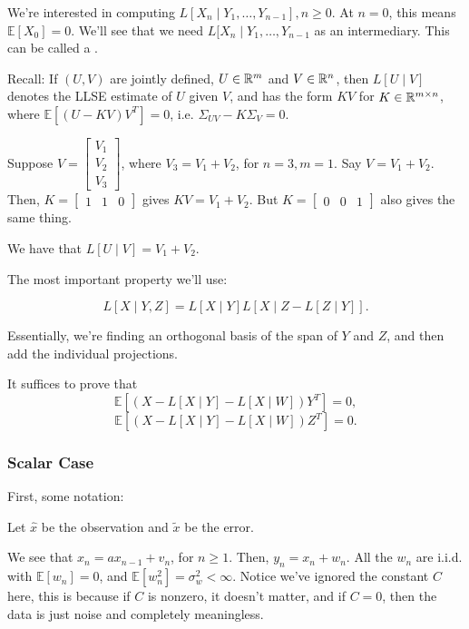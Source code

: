 \documentclass{article}
\newcommand{\EE}{\mathbb{E}}
\begin{document}
We're interested in computing $L[X_n \mid Y_1, \ldots, Y_{n-1}], n \geq 0$. At $n = 0$, this means $\EE[X_0] = 0$.
We'll see that we need $L[X_n \mid Y_1, \ldots, Y_{n-1}$ as an intermediary. This can be called a .

Recall: If $(U, V)$ are jointly defined, $U \in \mathbb R^m$ and $V \in \mathbb R^n$, then $L[U \mid V]$ denotes the LLSE estimate of $U$ given $V$, and has the form $KV$ for $K \in \mathbb R^{m \times n}$, where $\EE[(U - KV) V^T] = 0$, i.e. $\Sigma_{UV} - K\Sigma_V = 0$.

\begin{example}
	Suppose $V = \begin{bmatrix} V_1 \\ V_2 \\ V_3 \end{bmatrix}$, where $V_3 = V_1 + V_2$, for $n = 3, m = 1$. Say $V = V_1 + V_2$. Then, $K = \begin{bmatrix} 1 & 1 & 0 \end{bmatrix}$ gives $KV = V_1 + V_2$. But $K = \begin{bmatrix} 0 & 0 & 1 \end{bmatrix}$ also gives the same thing. 

	We have that $L[U \mid V] = V_1 + V_2$.
\end{example}

The most important property we'll use: 
\begin{lemma}
\[L[X \mid Y, Z] = L[X \mid Y] L[X \mid Z - L[Z \mid Y]].\]
\end{lemma}
Essentially, we're finding an orthogonal basis of the span of $Y$ and $Z$, and then add the individual projections.

It suffices to prove that
\[\EE[(X - L[X \mid Y] - L[X \mid W]) Y^T] = 0,\] 
\[\EE[(X - L[X \mid Y] - L[X \mid W]) Z^T] = 0.\]

\subsubsection{Scalar Case} 
First, some notation:
\begin{definition}
	Let $\hat{x}$ be the observation and $\tilde{x}$ be the error.
\end{definition}

We see that $x_n = a x_{n-1} + v_n$, for $n \geq 1$. Then, $y_n = x_n + w_n$. All the $w_n$ are i.i.d. with $\EE[w_n] = 0$, and $\EE[w_n^2] = \sigma_{w}^2 < \infty$. 
Notice we've ignored the constant $C$ here, this is because if $C$ is nonzero, it doesn't matter, and if $C = 0$, then the data is just noise and completely meaningless.
\end{document}
